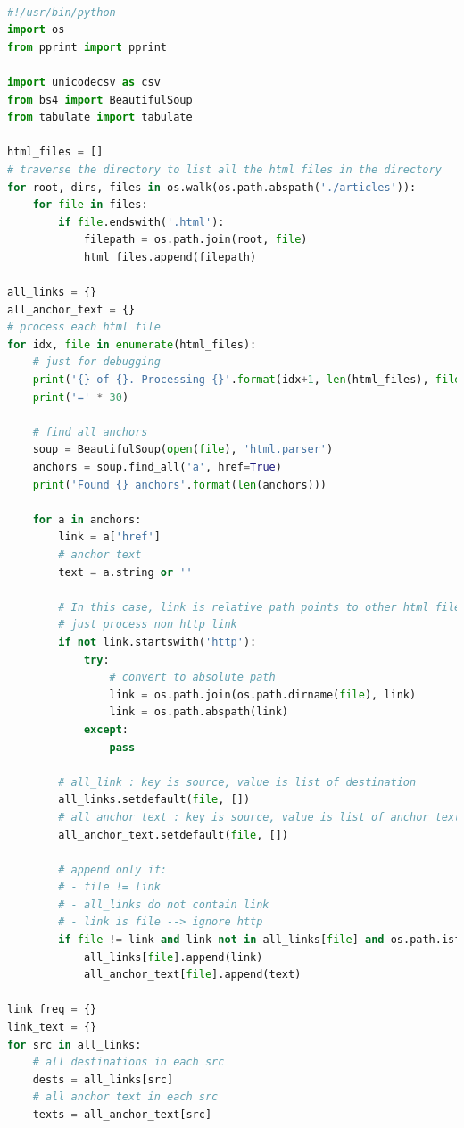 \documentclass[letterpaper,11pt]{article}
\begin{document}
\begin{lstlisting}[language=python, caption={Source code for finding 10 Wikipedia documents with the most inlinks}, label={lst:inlinks}]

#!/usr/bin/python
import os
from pprint import pprint

import unicodecsv as csv
from bs4 import BeautifulSoup
from tabulate import tabulate

html_files = []
# traverse the directory to list all the html files in the directory
for root, dirs, files in os.walk(os.path.abspath('./articles')):
    for file in files:
        if file.endswith('.html'):
            filepath = os.path.join(root, file)
            html_files.append(filepath)

all_links = {}
all_anchor_text = {}
# process each html file
for idx, file in enumerate(html_files):
    # just for debugging
    print('{} of {}. Processing {}'.format(idx+1, len(html_files), file))
    print('=' * 30)

    # find all anchors
    soup = BeautifulSoup(open(file), 'html.parser')
    anchors = soup.find_all('a', href=True)
    print('Found {} anchors'.format(len(anchors)))

    for a in anchors:
        link = a['href']
        # anchor text
        text = a.string or ''

        # In this case, link is relative path points to other html file
        # just process non http link
        if not link.startswith('http'):
            try:
                # convert to absolute path
                link = os.path.join(os.path.dirname(file), link)
                link = os.path.abspath(link)
            except:
                pass

        # all_link : key is source, value is list of destination
        all_links.setdefault(file, [])
        # all_anchor_text : key is source, value is list of anchor text
        all_anchor_text.setdefault(file, [])

        # append only if:
        # - file != link
        # - all_links do not contain link
        # - link is file --> ignore http
        if file != link and link not in all_links[file] and os.path.isfile(link):
            all_links[file].append(link)
            all_anchor_text[file].append(text)

link_freq = {}
link_text = {}
for src in all_links:
    # all destinations in each src
    dests = all_links[src]
    # all anchor text in each src
    texts = all_anchor_text[src]


\end{lstlisting}
\end{document}
